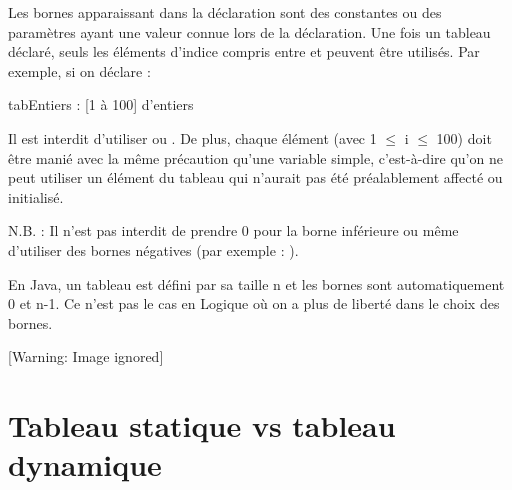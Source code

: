 {
Les bornes apparaissant dans la déclaration sont des constantes ou des
paramètres ayant une valeur connue lors de la déclaration. Une fois un
tableau déclaré, seuls les éléments d’indice compris entre
 et  peuvent
être utilisés. Par exemple, si on déclare :}

{\sffamily
tabEntiers :  [1 à 100] d’entiers}

{
Il est interdit d’utiliser  ou
. De plus, chaque élément
 (avec 1 ${\leq}$ i ${\leq}$ 100) doit
être manié avec la même précaution qu’une variable simple, c’est-à-dire
qu’on ne peut utiliser un élément du tableau qui n’aurait pas été
préalablement affecté ou initialisé. }

{
N.B. : Il n'est pas interdit de prendre 0 pour la borne
inférieure ou même d'utiliser des bornes négatives
(par exemple : ).}

{
En Java, un tableau est défini par sa taille n et les bornes sont
automatiquement 0 et n-1. Ce n'est pas le cas en
Logique où on a plus de liberté dans le choix des bornes.}

\begin{center}
 [Warning: Image ignored] %

\end{center}
\section{Tableau statique vs tableau dynamique}
{
}

{
}

{
}

